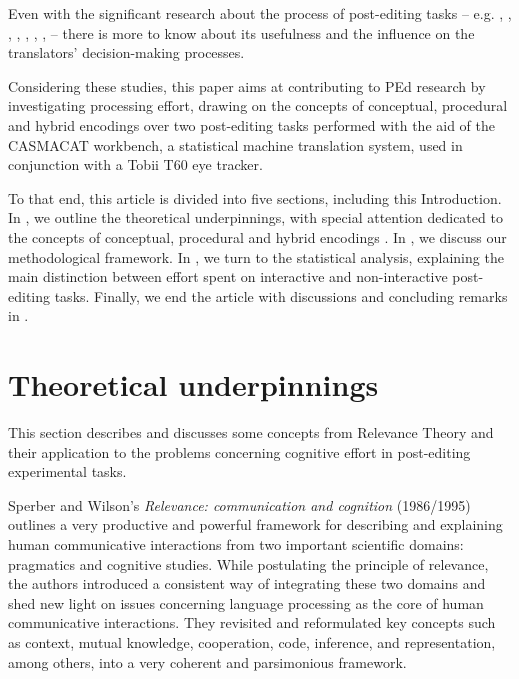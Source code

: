 \documentclass[output=paper]{langsci/langscibook}
\begin{document}
Even with the significant research about the process of post-editing tasks -- e.g. \citet{Guerberof2012}, \citet{obrien2006}, \citet{obrien2009}, \citet{Depraetere2010}, \citet{Plitt2010}, \citet{Sousa2011}, \citet{specia2009}, \citet{specia2011} -- there is more to know about its usefulness and the influence on the translators' decision-making processes. 



Considering these studies, this paper aims at contributing to PEd research by investigating processing effort, drawing on the concepts of conceptual, procedural and hybrid encodings over two post-editing tasks performed with the aid of the CASMACAT workbench, a statistical machine translation system, used in conjunction with a Tobii T60 eye tracker.



To that end, this article is divided into five sections, including this Introduction. In , we outline the theoretical underpinnings, with special attention dedicated to the concepts of conceptual, procedural and hybrid encodings \citep{moeschler1998, Wilson2011, alves2013}. In , we discuss our methodological framework. In , we turn to the statistical analysis, explaining the main distinction between effort spent on interactive and non-interactive post-editing tasks. Finally, we end the article with discussions and concluding remarks in .


\section{Theoretical underpinnings\label{alves:sec:TheoreticalUnderpinnings}}

This section describes and discusses some concepts from Relevance Theory \citep{Sperber1986second} and their application to the problems concerning cognitive effort in post-editing experimental tasks. 


Sperber and Wilson's \textit{Relevance: communication and cognition} (1986/1995) outlines a very productive and powerful framework for describing and explaining human communicative interactions from two important scientific domains: pragmatics and cognitive studies. While postulating the principle of relevance, the authors introduced a consistent way of integrating these two domains and shed new light on issues concerning language processing as the core of human communicative interactions. They revisited and reformulated key concepts such as context, mutual knowledge, cooperation, code, inference, and representation, among others, into a very coherent and parsimonious framework.
\end{document}
